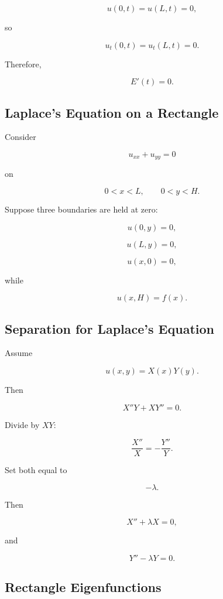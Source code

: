 \[
u(0,t)=u(L,t)=0,
\]

so

\[
u_t(0,t)=u_t(L,t)=0.
\]

Therefore,

\[
\boxed{
E'(t)=0.
}
\]

\subsection{Laplace's Equation on a Rectangle}
\label{subsec:laplace-rectangle}

Consider

\[
\boxed{
u_{xx}+u_{yy}=0
}
\]

on

\[
0<x<L,
\qquad
0<y<H.
\]

Suppose three boundaries are held at zero:

\[
u(0,y)=0,
\]

\[
u(L,y)=0,
\]

\[
u(x,0)=0,
\]

while

\[
u(x,H)=f(x).
\]

\subsection{Separation for Laplace's Equation}
\label{subsec:laplace-separation}

Assume

\[
u(x,y)=X(x)Y(y).
\]

Then

\[
X''Y+XY''=0.
\]

Divide by \(XY\):

\[
\frac{X''}{X}
=
-
\frac{Y''}{Y}.
\]

Set both equal to

\[
-\lambda.
\]

Then

\[
\boxed{
X''+\lambda X=0,
}
\]

and

\[
\boxed{
Y''-\lambda Y=0.
}
\]

\subsection{Rectangle Eigenfunctions}
\label{subsec:rectangle-eigenfunctions}

